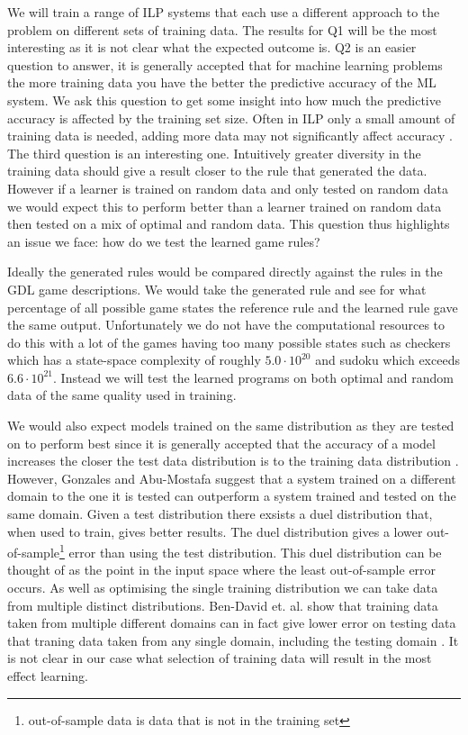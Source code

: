 We will train a range of ILP systems that each use a different approach to the problem on different sets of training data. The results for Q1 will be the most interesting as it is not clear what the expected outcome is. Q2 is an easier question to answer, it is generally accepted that for machine learning problems the more training data you have the better the predictive accuracy of the ML system. We ask this question to get some insight into how much the predictive accuracy is affected by the training set size. Often in ILP only a small amount of training data is needed, adding more data may not significantly affect accuracy \cite{Muggleton/ILP}. The third question is an interesting one. Intuitively greater diversity in the training data should give a result closer to the rule that generated the data. However if a learner is trained on random data and only tested on random data we would expect this to perform better than a learner trained on random data then tested on a mix of optimal and random data. This question thus highlights an issue we face: how do we test the learned game rules?

Ideally the generated rules would be compared directly against the rules in the GDL game descriptions. We would take the generated rule and see for what percentage of all possible game states the reference rule and the learned rule gave the same output. Unfortunately we do not have the computational resources to do this with a lot of the games having too many possible states such as checkers which has a state-space complexity of roughly $5.0 \cdot 10^{20}$\cite{Horssen/Checkers} and sudoku which exceeds $6.6 \cdot 10^{21}$\cite{Felgenhauer/Suduko}. Instead we will test the learned programs on both optimal and random data of the same quality used in training. 

We would also expect models trained on the same distribution as they are tested on to perform best since it is generally accepted that the accuracy of a model increases the closer the test data distribution is to the training data distribution \cite{Mitchell/MachineLearing}. However, Gonzales and Abu-Mostafa\cite{Gonzalez/MismatchedOutperform} suggest that a system trained on a different domain to the one it is tested can outperform a system trained and tested on the same domain. Given a test distribution there exsists a duel distribution that, when used to train, gives better results. The duel distribution gives a lower out-of-sample\footnote{out-of-sample data is data that is not in the training set} error than using the test distribution. This duel distribution can be thought of as the point in the input space where the least out-of-sample error occurs\cite{Gonzalez/MismatchedOutperform}. As well as optimising the single training distribution we can take data from multiple distinct distributions. Ben-David et. al. show that training data taken from multiple different domains can in fact give lower error on testing data that traning data taken from any single domain, including the testing domain \cite{Ben-David/DifferentDomains}. It is not clear in our case what selection of training data will result in the most effect learning.

